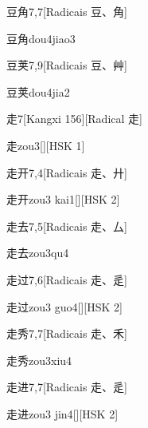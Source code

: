 \begin{entry}{豆角}{7,7}[Radicais ⾖、⾓]
  \begin{phonetics}{豆角}{dou4jiao3}
  \end{phonetics}
\end{entry}

\begin{entry}{豆荚}{7,9}[Radicais ⾖、⾋]
  \begin{phonetics}{豆荚}{dou4jia2}
  \end{phonetics}
\end{entry}

\begin{entry}{走}{7}[Kangxi 156][Radical ⾛]
  \begin{phonetics}{走}{zou3}[][HSK 1]
  \end{phonetics}
\end{entry}

\begin{entry}{走开}{7,4}[Radicais ⾛、⼶]
  \begin{phonetics}{走开}{zou3 kai1}[][HSK 2]
  \end{phonetics}
\end{entry}

\begin{entry}{走去}{7,5}[Radicais ⾛、⼛]
  \begin{phonetics}{走去}{zou3qu4}
  \end{phonetics}
\end{entry}

\begin{entry}{走过}{7,6}[Radicais ⾛、⾡]
  \begin{phonetics}{走过}{zou3 guo4}[][HSK 2]
  \end{phonetics}
\end{entry}

\begin{entry}{走秀}{7,7}[Radicais ⾛、⽲]
  \begin{phonetics}{走秀}{zou3xiu4}
  \end{phonetics}
\end{entry}

\begin{entry}{走进}{7,7}[Radicais ⾛、⾡]
  \begin{phonetics}{走进}{zou3 jin4}[][HSK 2]
  \end{phonetics}
\end{entry}

